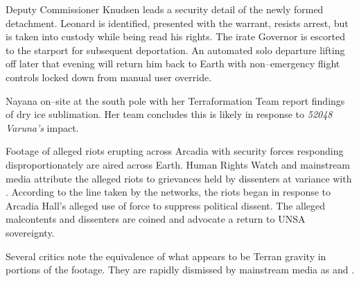 Deputy Commissioner Knudsen leads a security detail of the newly formed detachment. Leonard is identified, presented with the warrant, resists arrest, but is taken into custody while being read his rights. The irate Governor is escorted to the starport for subsequent deportation. An automated solo departure lifting off later that evening will return him back to Earth with non--emergency flight controls locked down from manual user override.
\StopTimelineDate

Nayana on--site at the south pole with her Terraformation Team report findings of dry ice sublimation. Her team concludes this is likely in response to {\it 52048 Varuna's} impact.
\StopTimelineDate

Footage of alleged riots erupting across Arcadia with security forces responding disproportionately are aired across Earth. Human Rights Watch and mainstream media attribute the alleged riots to grievances held by dissenters at variance with . According to the line taken by the networks, the riots began in response to Arcadia Hall's alleged use of force to suppress political dissent. The alleged malcontents and dissenters are coined  and advocate a return to UNSA sovereignty.

Several critics note the equivalence of what appears to be Terran gravity in portions of the footage. They are rapidly dismissed by mainstream media as  and .
\StopTimelineDate


